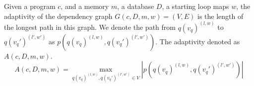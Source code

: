 %
%
%

%
%

\begin{defn}
Given a program $c$, and a memory $m$, a database $D$, a starting loop maps $w$, the adaptivity of the dependency graph $G(c, D,m,w) = (V, E)$ is the length of the longest path in this graph. We denote the path from $q(v_q)^{(l,w)}$ to $q(v_q')^{(l',w')}$ as $p(q(v_q)^{(l,w)}, q(v_q')^{(l',w')} )$. The adaptivity denoted as $A(c, D, m, w)$.
%
$$A(c, D, m, w) = \max\limits_{q(v_q)^{(l,w)},q(v_q')^{(l',w')} \in V } |p(q(v_q)^{(l,w)}, q(v_q')^{(l',w')} )| $$
\end{defn}




